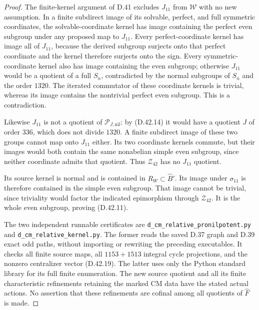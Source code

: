 \begin{proof}
The finite-kernel argument of
D.41 excludes $J_{11}$ from
$\mathcal W$ with no new
assumption. In a finite
subdirect image of its
solvable, perfect, and full
symmetric coordinates, the
solvable-coordinate kernel
has image containing the
perfect even subgroup under
any proposed map to $J_{11}$.
Every perfect-coordinate
kernel has image all of
$J_{11}$, because the derived
subgroup surjects onto that
perfect coordinate and the
kernel therefore surjects
onto the sign. Every
symmetric-coordinate kernel
also has image containing
the even subgroup; otherwise
$J_{11}$ would be a quotient
of a full $S_n$, contradicted
by the normal subgroups of
$S_n$ and the order $1320$.
The iterated commutator of
these coordinate kernels
is trivial, whereas its
image contains the nontrivial
perfect even subgroup.
This is a contradiction.

Likewise $J_{11}$ is not a
quotient of
$\mathcal P_{J,\mathrm{nil}}$:
by (D.42.14) it would have
a quotient $J$ of order
$336$, which does not divide
$1320$. A finite subdirect
image of these two groups
cannot map onto $J_{11}$
either. Its two coordinate
kernels commute, but their
images would both contain
the same nonabelian simple
even subgroup, since neither
coordinate admits that
quotient. Thus $\mathcal Z_{42}$
has no $J_{11}$ quotient.

Its source kernel is normal
and is contained in $R_W
\subset\widehat B'$. Its
image under $\sigma_{11}$
is therefore contained in
the simple even subgroup.
That image cannot be
trivial, since triviality
would factor the indicated
epimorphism through
$\mathcal Z_{42}$. It is
the whole even subgroup,
proving (D.42.11).

The two independent runnable
certificates are
\texttt{d\_cm\_relative\_pronilpotent.py}
and \texttt{d\_cm\_relative\_kernel.py}.
The former reads the saved D.37
graph and D.39 exact odd paths,
without importing or rewriting
the preceding executables.
It checks all finite source
maps, all $1153+1513$ integral
cycle projections, and the
nonzero centralizer vector
(D.42.19). The latter uses
only the Python standard
library for its full finite
enumeration. The new source
quotient and all its finite
characteristic refinements
retaining the marked CM data
have the stated actual
actions. No assertion that
these refinements are
cofinal among all quotients
of $\widehat F$ is made.
\end{proof}
